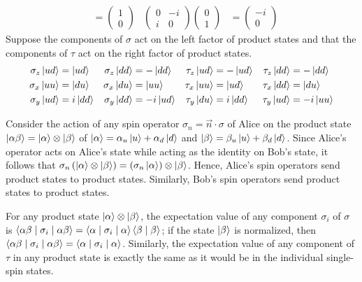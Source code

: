 \begin{answer}
\begin{align*}
		 & =
		\begin{pmatrix}
			1 \\ 0
		\end{pmatrix}
		 &
		\begin{pmatrix}
			0 & -i \\
			i & 0
		\end{pmatrix}
		\begin{pmatrix}
			0 \\ 1
		\end{pmatrix}
		 & =
		\begin{pmatrix}
			-i \\ 0
		\end{pmatrix}
	\end{align*}
	Suppose the components of $\sigma$ act on the left factor of product states and that the components of $\tau$ act on the right factor of product states.
	\begin{align}
		\sigma_z \ket{u d} & = \ket{u d}
		                   &
		\sigma_z \ket{d d} & = - \ket{d d}
		                   &
		\tau_z \ket{u d}   & = - \ket{u d}
		                   &
		\tau_z \ket{d d}   & = - \ket{d d}
		\\
		\sigma_x \ket{u u} & = \ket{d u}
		                   &
		\sigma_x \ket{d u} & = \ket{u u}
		                   &
		\tau_x \ket{u u}   & = \ket{u d}
		                   &
		\tau_x \ket{d d}   & = \ket{d u}
		\\
		\sigma_y \ket{u d} & = i \ket{d d}
		                   &
		\sigma_y \ket{d d} & = - i \ket{u d}
		                   &
		\tau_y \ket{d u}   & = i \ket{d d}
		                   &
		\tau_y \ket{u d}   & = -i \ket{u u}
	\end{align}
\end{answer}

\begin{answer}
	Consider the action of any spin operator $\sigma_{n} = \vec{n} \cdot \sigma$ of Alice on the product state $\ket{\alpha \beta} = \ket{\alpha} \otimes \ket{\beta}$ of $\ket{\alpha} = \alpha_u \ket{u} + \alpha_d \ket{d}$ and $\ket{\beta} = \beta_u \ket{u} + \beta_d \ket{d}$.
	Since Alice's operator acts on Alice's state while acting as the identity on Bob's state, it follows that $\sigma_n \left(\ket{\alpha} \otimes \ket{\beta}\right) = \left(\sigma_n \ket{\alpha} \right) \otimes \ket{\beta}$.
	Hence, Alice's spin operators send product states to product states.
	Similarly, Bob's spin operators send product states to product states.

	For any product state $\ket{\alpha} \otimes \ket{\beta}$, the expectation value of any component $\sigma_i$ of $\sigma$ is $\braket{\alpha \beta \mid \sigma_i \mid \alpha \beta} =  \braket{\alpha \mid \sigma_i \mid \alpha} \braket{\beta \mid \beta}$; if the state $\ket{\beta}$ is normalized, then $\braket{\alpha \beta \mid \sigma_i \mid \alpha \beta} = \braket{\alpha \mid \sigma_i \mid \alpha}$.
	Similarly, the expectation value of any component of $\tau$ in any product state is exactly the same as it would be in the individual single-spin states.
\end{answer}

